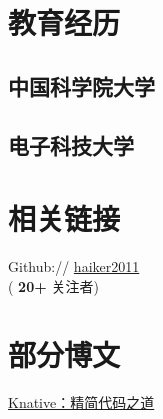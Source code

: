 \documentclass[]{deedy-resume-openfont}
\begin{document}
%
%
\lastupdated

%
%

%
%

\begin{minipage}[t]{0.3\textwidth} 


\section{教育经历} 
\sectionsep

\subsection{中国科学院大学}
\sectionsep

\subsection{电子科技大学}
\sectionsep


\section{相关链接}
\sectionsep    
Github:// \href{https://github.com/haiker2011}{haiker2011} \\
{(\textbf{ 20+ }关注者)} \\

\section{部分博文}
\sectionsep
\href{http://www.servicemesher.com/blog/knative-whittling-down-the-code/}{Knative：精简代码之道} \\


\end{minipage}
\end{document}
